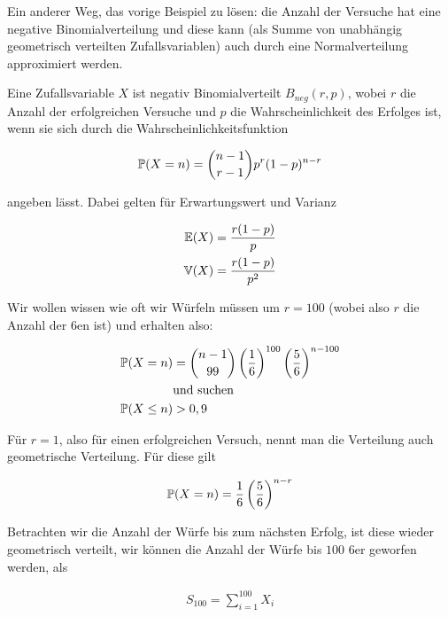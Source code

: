 \begin{exercise}

Ein anderer Weg, das vorige Beispiel zu lösen: die Anzahl der Versuche hat eine negative Binomialverteilung und diese kann (als Summe von unabhängig geometrisch verteilten Zufallsvariablen) auch durch eine Normalverteilung approximiert werden.

\end{exercise}

\begin{solution}

Eine Zufallsvariable $X$ ist negativ Binomialverteilt $B_{neg} (r,p)$, wobei
$r$ die Anzahl der erfolgreichen Versuche und $p$ die Wahrscheinlichkeit
des Erfolges ist, wenn sie sich durch die Wahrscheinlichkeitsfunktion

\begin{align*}
  \P(X=n) = \binom{n-1}{r-1}p^r(1-p)^{n-r}
\end{align*}

angeben lässt. Dabei gelten für Erwartungswert und Varianz

\begin{align*}
  \E(X) &= \frac{r(1-p)}{p} \\
  \V(X) &= \frac{r(1-p)}{p^2}
\end{align*}

Wir wollen wissen wie oft wir Würfeln müssen um $r=100$ (wobei also $r$ die
Anzahl der $6$en ist) und erhalten also:

\begin{align*}
  \P(X=n) &= \binom{n-1}{99}\pbraces{\frac{1}{6}}^{100}\pbraces{\frac{5}{6}}^{n-100} \\
  &\text{und suchen} \\
  \P(X \leq n) &> 0,9
\end{align*}

Für $r=1$, also für einen erfolgreichen Versuch, nennt man die Verteilung auch
geometrische Verteilung. Für diese gilt

\begin{align*}
  \P(X=n)=\frac{1}{6}\pbraces{\frac{5}{6}}^{n-r}
\end{align*}

Betrachten wir die Anzahl der Würfe bis zum nächsten Erfolg, ist diese wieder
geometrisch verteilt, wir können die Anzahl der Würfe bis $100$ $6$er geworfen
werden, als

\begin{align*}
  S_{100} = \sum_{i=1}^{100}X_i
\end{align*}


\end{solution}
